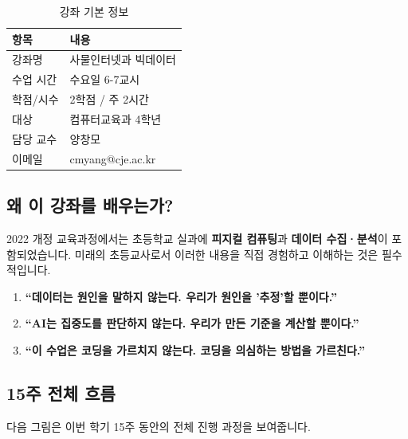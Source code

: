 \documentclass[11pt, a4paper]{article}
\begin{document}
\begin{table}[H]
\centering
\begin{tabularx}{\textwidth}{lX}
\toprule
\textbf{항목} & \textbf{내용} \\
\midrule
강좌명 & 사물인터넷과 빅데이터 \\
수업 시간 & 수요일 6-7교시 \\
학점/시수 & 2학점 / 주 2시간 \\
대상 & 컴퓨터교육과 4학년 \\
담당 교수 & 양창모 \\
이메일 & cmyang@cje.ac.kr \\
\bottomrule
\end{tabularx}
\caption{강좌 기본 정보}
\end{table}

\subsection{왜 이 강좌를 배우는가?}

2022 개정 교육과정에서는 초등학교 실과에 \textbf{피지컬 컴퓨팅}과 \textbf{데이터 수집·분석}이 포함되었습니다. 미래의 초등교사로서 이러한 내용을 직접 경험하고 이해하는 것은 필수적입니다.

\begin{keypoint}
\begin{enumerate}
    \item \textbf{``데이터는 원인을 말하지 않는다. 우리가 원인을 '추정'할 뿐이다.''}
    \item \textbf{``AI는 집중도를 판단하지 않는다. 우리가 만든 기준을 계산할 뿐이다.''}
    \item \textbf{``이 수업은 코딩을 가르치지 않는다. 코딩을 의심하는 방법을 가르친다.''}
\end{enumerate}
\end{keypoint}

\subsection{15주 전체 흐름}

다음 그림은 이번 학기 15주 동안의 전체 진행 과정을 보여줍니다.
\end{document}
